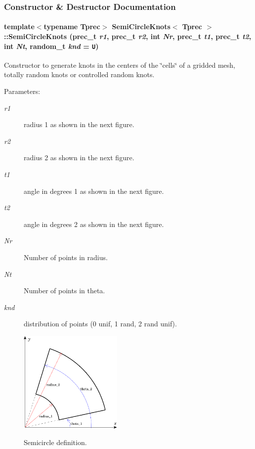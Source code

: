 \subsubsection{Constructor \& Destructor Documentation}
\hypertarget{classSemiCircleKnots_0fe39c4f9efa84df5b87c0a01d1a3a18}{
\paragraph[{SemiCircleKnots}]{\setlength{\rightskip}{0pt plus 5cm}template$<$typename Tprec$>$ {\bf SemiCircleKnots}$<$ Tprec $>$::{\bf SemiCircleKnots} (prec\_\-t {\em r1}, \/  prec\_\-t {\em r2}, \/  int {\em Nr}, \/  prec\_\-t {\em t1}, \/  prec\_\-t {\em t2}, \/  int {\em Nt}, \/  random\_\-t {\em knd} = {\tt U})}\hfill}
\label{classSemiCircleKnots_0fe39c4f9efa84df5b87c0a01d1a3a18}


Constructor to generate knots in the centers of the \char`\"{}cells\char`\"{} of a gridded mesh, totally random knots or controlled random knots. 

\begin{Desc}
\item[Parameters:]
\begin{description}
\item[{\em r1}]radius 1 as shown in the next figure. \item[{\em r2}]radius 2 as shown in the next figure. \item[{\em t1}]angle in degrees 1 as shown in the next figure. \item[{\em t2}]angle in degrees 2 as shown in the next figure. \item[{\em Nr}]Number of points in radius. \item[{\em Nt}]Number of points in theta. \item[{\em knd}]distribution of points (0 unif, 1 rand, 2 rand unif).  \begin{Image}
\begin{center}
\includegraphics[width=5cm]{SemiCircle}\caption{Semicircle definition.}
\end{center}
\end{Image}
 \end{description}
\end{Desc}


